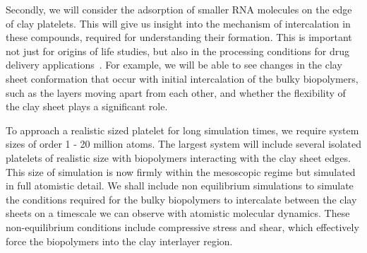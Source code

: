 \begin{compactenum}[a)]
%
Secondly, we will consider the adsorption of smaller RNA molecules on the edge of clay platelets. 
This will give us insight into the mechanism of
intercalation in these compounds, required for understanding their formation. This is important not just for origins of life studies, but also in the processing conditions for drug delivery applications~\cite{understanding}. For example, we will be able to see changes in the clay sheet conformation that occur with initial intercalation of the bulky biopolymers, such as the layers moving apart from each other, and whether the flexibility of the clay sheet plays a significant role. 

To approach a realistic sized platelet for long simulation times, we require system sizes 
of order 1 - 20 million atoms. The largest system will include several isolated platelets of 
realistic size with biopolymers interacting with the clay sheet edges. This size of simulation 
is now firmly within the mesoscopic regime but simulated in full atomistic detail. We shall 
include non equilibrium simulations to simulate the conditions required for the bulky biopolymers 
to intercalate between the clay sheets on a timescale we can observe with atomistic molecular 
dynamics. These non-equilibrium conditions include compressive stress and shear, which effectively 
force the biopolymers into the clay interlayer region.


\end{compactenum}
